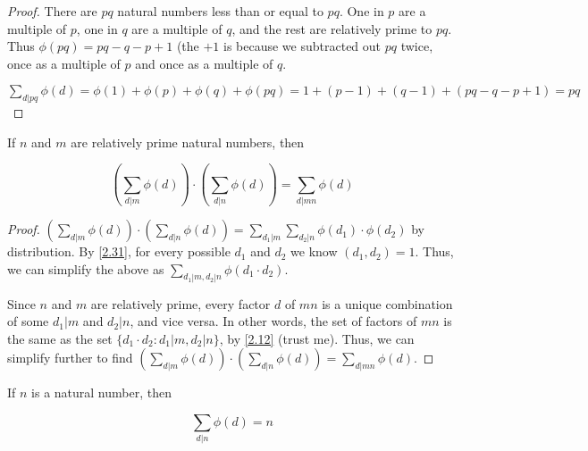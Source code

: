 \documentclass[../main.tex]{subfiles}
\begin{document}
\begin{proof}
  There are $pq$ natural numbers less than or equal to $pq$. One in $p$ are a multiple of $p$, one in $q$ are a multiple of $q$, and the rest are relatively prime to $pq$. Thus $\phi(pq) = pq - q - p + 1$ (the $+1$ is because we subtracted out $pq$ twice, once as a multiple of $p$ and once as a multiple of $q$.

  $\sum_{d|pq} \phi(d) = \phi(1) + \phi(p) + \phi(q) + \phi(pq) = 1 + (p-1) + (q-1) + (pq - q - p + 1) = pq$
\end{proof}



\begin{thm} \label{6.14}
  If $n$ and $m$ are relatively prime natural numbers, then

  $$\left( \sum_{d|m} \phi(d) \right) \cdot \left( \sum_{d|n} \phi(d) \right) = \sum_{d|mn} \phi(d)$$
\end{thm}

\begin{proof}
  $(\sum_{d|m} \phi(d)) \cdot (\sum_{d|n} \phi(d)) = \sum_{d_1|m} \sum_{d_2|n} \phi(d_1) \cdot \phi(d_2)$ by distribution. By \ref{2.31}, for every possible $d_1$ and $d_2$ we know $(d_1, d_2) = 1$. Thus, we can simplify the above as $\sum_{d_1|m, d_2 | n} \phi(d_1 \cdot d_2)$.

  Since $n$ and $m$ are relatively prime, every factor $d$ of $mn$ is a unique combination of some $d_1 | m$ and $d_2 | n$, and vice versa. In other words, the set of factors of $mn$ is the same as the set $\{d_1 \cdot d_2 : d_1 | m, d_2 | n\}$, by \ref{2.12} (trust me). Thus, we can simplify further to find $(\sum_{d|m} \phi(d)) \cdot (\sum_{d|n} \phi(d)) = \sum_{d|mn} \phi(d)$.
\end{proof}



\begin{thm} \label{6.15}
  If $n$ is a natural number, then

  $$\sum_{d|n} \phi(d) = n$$
\end{thm}
\end{document}
